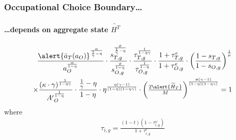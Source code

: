 \documentclass[11pt]{beamer}
\begin{document}

\begin{frame}
\frametitle{Occupational Choice Boundary\ldots}
\framesubtitle{\ldots depends on aggregate state $\widetilde{H^T}$} 
\begin{align*}
	\frac{\alert{\bar{a}_T(a_O)}^\frac{\alpha}{\frac{1}{\gamma}-\eta}}{a_O^\frac{\alpha}{1-\eta}} \cdot \frac{s_{T,g}^\frac{\phi}{\frac{1}{\gamma}-\eta}}{s_{O,g}^\frac{\phi}{1-\eta}}\cdot \frac{\tau_{T,g}^\frac{1}{1-\eta\gamma}}{\tau_{O,g}^\frac{1}{1-\eta}} \cdot \frac{1+\tau^e_{T,g}}{1+\tau^e_{O,g}}\cdot \left(\frac{1-s_{T,g}}{1-s_{O,g}}\right)^\frac{1}{\mu} \nonumber\\
	\times \frac{\left(\kappa \cdot \gamma\right)^\frac{1}{1-\eta\gamma}}{{A'}_O^\frac{1}{1-\eta}} \cdot \frac{\frac{1}{\gamma}-\eta}{1-\eta}\cdot \eta^\frac{\eta(\gamma-1)}{(1-\eta)(1-\eta\gamma)} \cdot \left(\tfrac{2\alert{\widetilde{H}_T}}{M}\right)^{\frac{\sigma(\gamma-1)}{(1-\eta)(1-\eta\gamma)}}=1 \nonumber%
\end{align*}
where
\begin{align}
	\tau_{i,g} =\frac{(1-t)(1-\tau^{\omega}_{i,g})}{1+\tau^e_{i,g}} \nonumber
\end{align}
\end{frame}
\end{document}
